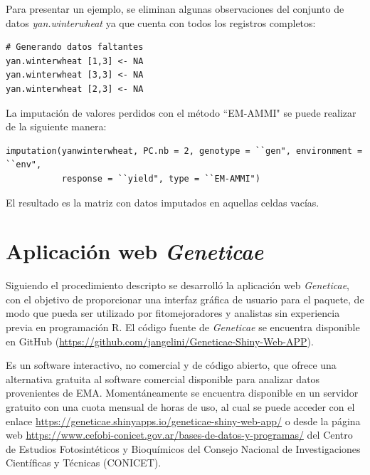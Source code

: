 Para presentar un ejemplo, se eliminan algunas observaciones del conjunto de datos \emph{yan.winterwheat} ya que cuenta con todos los registros completos:

\begin{tcolorbox}[skin=bicolor,
    colframe=aurometalsaurus,colback=backcolour,colbacklower=white,
    width=1\linewidth,
    height=0.15\linewidth,
    boxsep=-3mm]
\begin{lstlisting}
# Generando datos faltantes
yan.winterwheat [1,3] <- NA
yan.winterwheat [3,3] <- NA
yan.winterwheat [2,3] <- NA
\end{lstlisting}
\end{tcolorbox}

La imputación de valores perdidos con el método ``EM-AMMI" se puede realizar de la siguiente manera:

\begin{tcolorbox}[skin=bicolor,
    colframe=aurometalsaurus,colback=backcolour,colbacklower=white,
    width=1\linewidth,
    height=0.08\linewidth,
    boxsep=-3mm]
\begin{lstlisting}
imputation(yanwinterwheat, PC.nb = 2, genotype = ``gen", environment = ``env", 
           response = ``yield", type = ``EM-AMMI")
\end{lstlisting}
\end{tcolorbox}

El resultado es la matriz con datos imputados en aquellas celdas vacías. 

\section{Aplicación web \emph{Geneticae}}

Siguiendo el procedimiento descripto se desarrolló la aplicación web \emph{Geneticae}, con el objetivo de proporcionar una interfaz gráfica de usuario para el paquete, de modo que pueda ser utilizado por fitomejoradores y analistas sin experiencia previa en programación R. El código fuente de \emph{Geneticae} se encuentra disponible en GitHub (\url{https://github.com/jangelini/Geneticae-Shiny-Web-APP}). 

Es un software interactivo, no comercial y de código abierto, que ofrece una alternativa gratuita al software comercial disponible para analizar datos provenientes de EMA. Momentáneamente se encuentra disponible en un servidor gratuito con una cuota mensual de horas de uso, al cual se puede acceder con el enlace \url{https://geneticae.shinyapps.io/geneticae-shiny-web-app/} o desde la página web \url{https://www.cefobi-conicet.gov.ar/bases-de-datos-y-programas/} del Centro de Estudios Fotosintéticos y Bioquímicos del Consejo Nacional de Investigaciones Científicas y Técnicas (CONICET).

